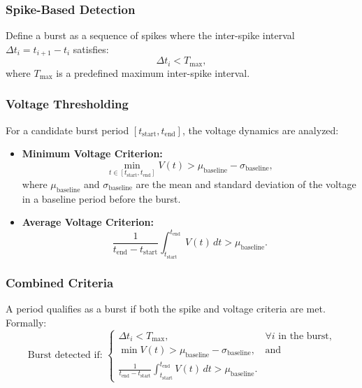 \documentclass[a4paper,9pt]{extarticle}
\begin{document}
\subsubsection{Spike-Based Detection}
Define a burst as a sequence of spikes where the inter-spike interval $\Delta t_i = t_{i+1} - t_i$ satisfies:
\[
\Delta t_i < T_{\text{max}},
\]
where $T_{\text{max}}$ is a predefined maximum inter-spike interval.

\subsubsection{Voltage Thresholding}
For a candidate burst period $[t_{\text{start}}, t_{\text{end}}]$, the voltage dynamics are analyzed:
\begin{itemize}
    \item \textbf{Minimum Voltage Criterion:}
    \[
    \min_{t \in [t_{\text{start}}, t_{\text{end}}]} V(t) > \mu_{\text{baseline}} - \sigma_{\text{baseline}},
    \]
    where $\mu_{\text{baseline}}$ and $\sigma_{\text{baseline}}$ are the mean and standard deviation of the voltage in a baseline period before the burst.

    \item \textbf{Average Voltage Criterion:}
    \[
    \frac{1}{t_{\text{end}} - t_{\text{start}}} \int_{t_{\text{start}}}^{t_{\text{end}}} V(t) \, dt > \mu_{\text{baseline}}.
    \]
\end{itemize}

\subsubsection{Combined Criteria}
A period qualifies as a burst if both the spike and voltage criteria are met. Formally:
\[
\text{Burst detected if: }
\begin{cases} 
    \Delta t_i < T_{\text{max}}, & \forall i \text{ in the burst,} \\
    \min V(t) > \mu_{\text{baseline}} - \sigma_{\text{baseline}}, & \text{and} \\
    \frac{1}{t_{\text{end}} - t_{\text{start}}} \int_{t_{\text{start}}}^{t_{\text{end}}} V(t) \, dt > \mu_{\text{baseline}}.
\end{cases}
\]
\end{document}
